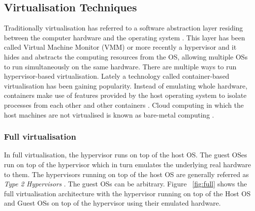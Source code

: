 \subsection{Virtualisation Techniques}

Traditionally virtualisation has referred to a software abstraction layer residing between the computer hardware and the operating system \cite{taxonomy}. This layer has been called Virtual Machine Monitor (VMM) or more recently a hypervisor and it hides and abstracts the computing resources from the OS, allowing multiple OSs to run simultaneously on the same hardware. There are multiple ways to run hypervisor-based virtualisation. Lately a technology called container-based virtualisation has been gaining popularity. Instead of emulating whole hardware, containers make use of features provided by the host operating system to isolate processes from each other and other containers \cite{eder2016hypervisor}. Cloud computing in which the host machines are not virtualised is known as bare-metal computing \cite{virtualisation_overhead}.

\subsubsection{Full virtualisation}

In full virtualisation, the hypervisor runs on top of the host OS. The guest OSes run on top of the hypervisor which in turn emulates the underlying real hardware to them. The hypervisors running on top of the host OS are generally referred as \textit{Type 2 Hypervisors} \cite{eder2016hypervisor}. The guest OSs can be arbitrary. Figure ~\ref{fig:full} shows the full virtualisation architecture with the hypervisor running on top of the Host OS and Guest OSs on top of the hypervisor using their emulated hardware. 

